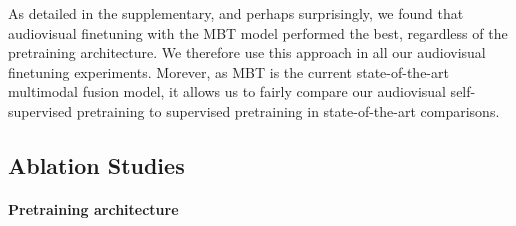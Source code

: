 \documentclass[10pt,twocolumn,letterpaper]{article}
\begin{document}
As detailed in the supplementary, and perhaps surprisingly, we found that audiovisual finetuning with the MBT model performed the best, regardless of the pretraining architecture.
We therefore use this approach in all our audiovisual finetuning experiments.
Morever, as MBT is the current state-of-the-art multimodal fusion model, it allows us to fairly compare our audiovisual self-supervised pretraining to supervised pretraining in state-of-the-art comparisons.


\subsection{Ablation Studies}
\label{sec:exp_ablations}
\vspace{-1mm}

\paragraph{Pretraining architecture}

\begin{table}[t]
\caption{Ablation study of different pretraining architectures.
Models are pretrained from random initialisation for 400 epochs on VGGSound, and then finetuned on the same dataset.
}
\vspace{-0.6\baselineskip}
\centering
{}
\vspace{-\baselineskip}


\label{tab:ablation_pretraining_arch}
\end{table}
 
\end{document}
